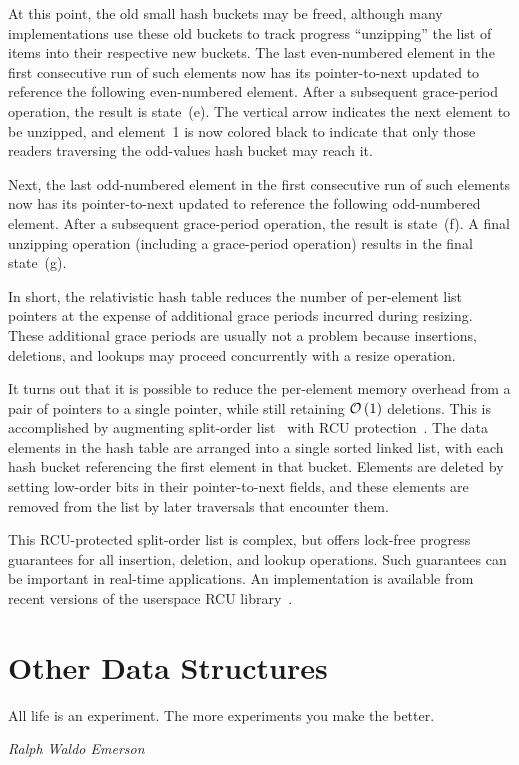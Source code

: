 At this point, the old small hash buckets may be freed, although many
implementations use these old buckets to track progress ``unzipping''
the list of items into their respective new buckets.
The last even-numbered element in the first consecutive run of such
elements now has its pointer-to-next updated to reference the following
even-numbered element.
After a subsequent grace-period operation, the result is state~(e).
The vertical arrow indicates the next element to be unzipped, and
element~1 is now colored black to indicate that only those readers traversing
the odd-values hash bucket may reach it.

Next, the last odd-numbered element in the first consecutive run of such
elements now has its pointer-to-next updated to reference the following
odd-numbered element.
After a subsequent grace-period operation, the result is state~(f).
A final unzipping operation (including a grace-period operation)
results in the final state~(g).

In short, the relativistic hash table reduces the number of per-element
list pointers at the expense of additional grace periods incurred during
resizing.
These additional grace periods are usually not a problem because
insertions, deletions, and lookups may proceed concurrently with
a resize operation.

It turns out that it is possible to reduce the per-element memory overhead
from a pair of pointers to a single pointer, while still retaining
$\mathcal{O}\left(1\right)$ deletions.
This is accomplished by augmenting split-order
list~\cite{OriShalev2006SplitOrderListHash}
with RCU
protection~\cite{MathieuDesnoyers2009URCU,PaulMcKenney2013LWNURCUhash}.
The data elements in the hash table are arranged into a single
sorted linked list, with each hash bucket referencing the first element
in that bucket.
Elements are deleted by setting low-order bits in their pointer-to-next
fields, and these elements are removed from the list by later traversals
that encounter them.

This RCU-protected split-order list is complex, but offers lock-free
progress guarantees for all insertion, deletion, and lookup operations.
Such guarantees can be important in real-time applications.
An implementation is available from recent versions of the userspace RCU
library~\cite{MathieuDesnoyers2009URCU}.

\section{Other Data Structures}
\label{sec:datastruct:Other Data Structures}
%
\epigraph{All life is an experiment.  The more experiments you make the better.}
	 {\emph{Ralph Waldo Emerson}}

